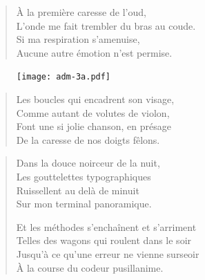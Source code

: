 \begin{verse}\quatrain
  À la première caresse de l’oud,\\  %
  L’onde me fait trembler du bras au coude.\\   %
  Si ma respiration s’amenuise,\\   %
  Aucune autre émotion n’est permise. 
\end{verse}

\begin{figure}[h]
  \centering
  \texttt{[image: adm-3a.pdf]}
  \captionsetup{labelformat=empty}
  \caption[Terminal ADM-3A]{}
\end{figure}




\begin{verse}\quatrain
  Les boucles qui encadrent son visage,\\  %
  Comme autant de volutes de violon,\\  %
  Font une si jolie chanson, en présage\\  %
  De la caresse de nos doigts fêlons.
\end{verse}

\begin{verse}\quatrain
  Dans la douce noirceur de la nuit,\\  %
  Les gouttelettes typographiques\\  %
  Ruissellent au delà de minuit\\  %
  Sur mon terminal panoramique.

  Et les méthodes
  s’enchaînent et s’arriment\\  %
  Telles des wagons qui roulent dans le soir\\  %
  Jusqu’à ce qu’une erreur ne vienne surseoir\\  %
  À la course du codeur pusillanime.
\end{verse}

